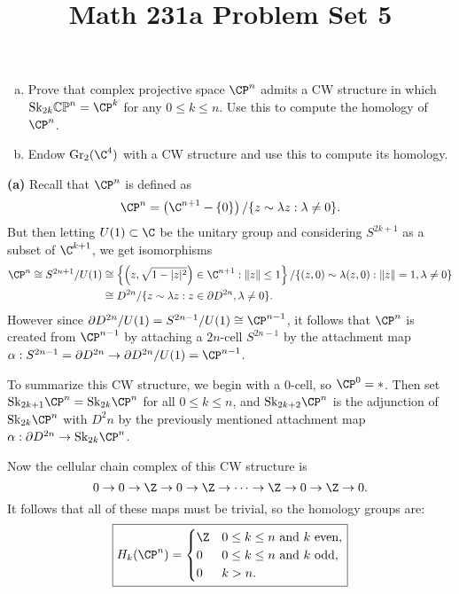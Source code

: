 \documentclass[11pt,letterpaper]{article}
\title{\textbf{Math 231a Problem Set 5}}
\providecommand{\Sk}{\text{Sk}}
\providecommand{\Gr}{\text{Gr}}
\begin{document}
\maketitle

\begin{problem}\noindent
    \begin{enumerate}[(a)]
        \item Prove that complex projective space $\CP^n$ admits a CW structure in which $\Sk_{2k}\mathbb{CP}^n=\CP^k$ for any $0\leq k\leq n$. Use this to compute the homology of $\CP^n$.
        \item Endow $\Gr_2(\C^4)$ with a CW structure and use this to compute its homology.  
    \end{enumerate}
\end{problem}

\begin{solution}
    \textbf{(a)} Recall that $\CP^n$ is defined as
    \[
        \CP^n = \left(\C^{n+1} - \{0\}\right) / \{z\sim \lambda z : \lambda \neq 0\}
    .\]  
    But then letting $U(1)\subset \C$ be the unitary group and considering $S^{2k+1}$ as a subset of $\C^{k+1}$, we get isomorphisms
    \[
        \begin{aligned}
            \CP^n\cong S^{2n+1} / U(1) &\cong \left\{ \left(z, \sqrt{1-|z|^2}\right)\in \C^{n+1} : \|z\|\leq 1\right\} / \{(z,0) \sim \lambda (z,0) : \|z\|=1, \lambda \neq 0\}\\
            &\cong D^{2n} / \{z \sim \lambda z : z\in \partial D^{2n}, \lambda\neq 0\}.
        \end{aligned}
    \]
    However since $\partial D^{2n} / U(1) = S^{2n-1} / U(1) \cong \CP^{n-1}$, it follows that $\CP^n$ is created from $\CP^{n-1}$ by attaching a $2n$-cell $S^{2n-1}$ by the attachment map $\alpha : S^{2n-1} = \partial D^{2n} \to \partial D^{2n} / U(1) = \CP^{n-1}$. 
    
    \quad To summarize this CW structure, we begin with a $0$-cell, so $\CP^0=*$. Then set $\Sk_{2k+1} \CP^n = \Sk_{2k} \CP^n$ for all $0\leq k\leq n$, and $\Sk_{2k+2} \CP^n$ is the adjunction of $\Sk_{2k} \CP^n$ with $D^2n$ by the previously mentioned attachment map $\alpha : \partial D^{2n} \to \Sk_{2k} \CP^n$.
    
    \quad Now the cellular chain complex of this CW structure is 
    \[
        0 \to 0 \to \Z \to 0 \to \Z \to \cdots \to \Z \to 0 \to \Z \to 0
    .\] 
    It follows that all of these maps must be trivial, so the homology groups are:
    \[
        \boxed{H_k(\CP^n) = \begin{cases}
            \Z & 0\leq k\leq n\text{ and } k\text{ even},\\
            0 & 0\leq k\leq n\text{ and } k\text{ odd},\\
            0 & k>n.
        \end{cases}}
    \] 
        

\end{solution}
\end{document}
